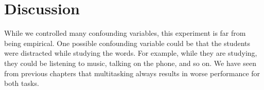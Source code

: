 \documentclass[stu,12pt,floatsintext]{apa7}
\begin{document}
\renewcommand{\theenumi}{\arabic{enumi}}
\renewcommand{\labelenumi}{\theenumi.}
\section{Discussion}

While we controlled many confounding variables, this experiment is far from being empirical. One possible confounding variable could be that the students were distracted while studying the words. For example, while they are studying, they could be listening to music, talking on the phone, and so on. We have seen from previous chapters that multitasking always results in worse performance for both tasks.  
\end{document}
